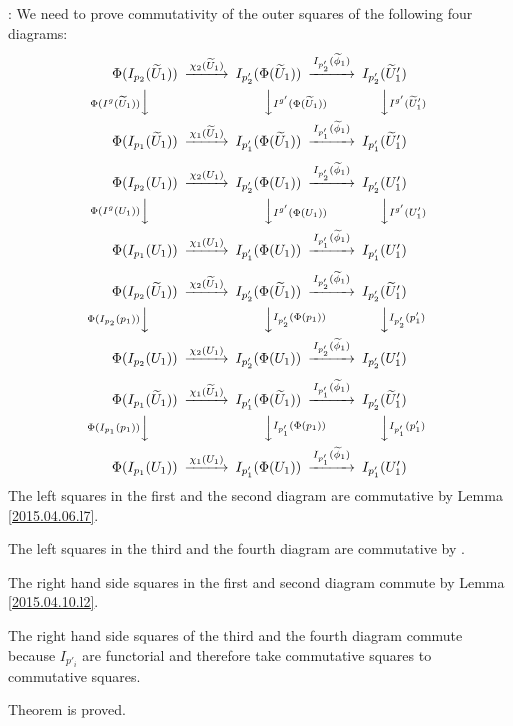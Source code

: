 \documentclass[12pt]{article}
\newenvironment{myproof}{{\bf Proof}:}{\vskip 5mm }
\newcommand{\wt}{\widetilde}
\begin{document}
\begin{myproof}
We need to prove commutativity of the outer squares of the following four diagrams:
%
$$
\begin{CD}
\Phi(I_{p_2}(\wt{U}_1)) @>\chi_2(\wt{U}_1)>> I_{p_2'}(\Phi(\wt{U}_1)) @>I_{p_2'}(\wt{\phi}_1)>> I_{p_2'}(\wt{U}_1')\\
@V\Phi(I^g(\wt{U}_1))VV @VV I^{g'}(\Phi(\wt{U}_1)) V @VV I^{g'}(\wt{U}_1') V\\
\Phi(I_{p_1}(\wt{U}_1)) @>\chi_1(\wt{U}_1)>> I_{p_1'}(\Phi(\wt{U}_1)) @>I_{p_1'}(\wt{\phi}_1)>> I_{p_1'}(\wt{U}_1')
\end{CD}
$$
%
$$
\begin{CD}
\Phi(I_{p_2}(U_1)) @>\chi_2(U_1)>> I_{p_2'}(\Phi(U_1)) @>I_{p_2'}(\wt{\phi}_1)>> I_{p_2'}(U_1')\\
@V\Phi(I^g(U_1))VV @VV I^{g'}(\Phi(U_1)) V @VV I^{g'}(U_1') V\\
\Phi(I_{p_1}(U_1)) @>\chi_1(U_1)>> I_{p_1'}(\Phi(U_1)) @>I_{p_1'}(\wt{\phi}_1)>> I_{p_1'}(U_1')
\end{CD}
$$
%
$$
\begin{CD}
\Phi(I_{p_2}(\wt{U}_1)) @>\chi_2(\wt{U}_1)>> I_{p_2'}(\Phi(\wt{U}_1)) @>I_{p_2'}(\wt{\phi}_1)>> I_{p_2'}(\wt{U}_1')\\
@V\Phi(I_{p_2}(p_1)) VV @VV I_{p_2'}(\Phi(p_1)) V @VVI_{p_2'}(p_1') V\\
\Phi(I_{p_2}(U_1)) @>\chi_2(U_1)>> I_{p_2'}(\Phi(U_1)) @>I_{p_2'}(\wt{\phi}_1)>> I_{p_2'}(U_1')
\end{CD}
$$
%
$$
\begin{CD}
\Phi(I_{p_1}(\wt{U}_1)) @>\chi_1(\wt{U}_1)>> I_{p_1'}(\Phi(\wt{U}_1)) @>I_{p_1'}(\wt{\phi}_1)>> I_{p_2'}(\wt{U}_1')\\
@V\Phi(I_{p_1}(p_1)) VV @VV I_{p_1'}(\Phi(p_1)) V @VVI_{p_1'}(p_1') V\\
\Phi(I_{p_1}(U_1)) @>\chi_1(U_1)>> I_{p_1'}(\Phi(U_1)) @>I_{p_1'}(\wt{\phi}_1)>> I_{p_1'}(U_1')
\end{CD}
$$
%
The left squares in the first and the second diagram are commutative by Lemma \ref{2015.04.06.l7}.

The left squares in the third and the fourth diagram are commutative by \cite[Lemma 5.7]{fromunivwithPi}.

The right hand side squares in the first and second diagram commute by Lemma \ref{2015.04.10.l2}. 

The right hand side squares of the third and the fourth diagram commute because $I_{p'_i}$ are functorial and therefore take commutative squares to commutative squares.

Theorem is proved.
\end{myproof}
\end{document}
